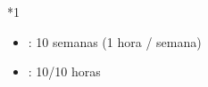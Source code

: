 \documentclass[letterpaper,10pt,spanish]{sphinxmanual}
\begin{document}
\begin{savenotes}
\begin{tabular}[t]{}
\begin{savenotes}
\begin{tabular}[t]{*{1}{}}
\begin{itemize}
\item {} 
\sphinxAtStartPar
{}: 10 semanas (1 hora / semana)

\item {} 
\sphinxAtStartPar
{}: 10/10 horas

\end{itemize}
\\
\sphinxbottomrule
\end{tabular}
\sphinxtableafterendhook\par
\sphinxattableend\end{savenotes}
\\
\sphinxbottomrule
\end{tabular}
\sphinxtableafterendhook\par
\sphinxattableend\end{savenotes}
\end{document}
